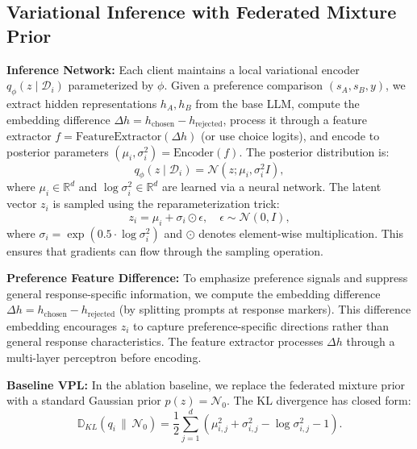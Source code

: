 \subsection{Variational Inference with Federated Mixture Prior}
\label{sec:variational}

\textbf{Inference Network:} Each client maintains a local variational encoder $q_\phi(z \mid \mathcal{D}_i)$ parameterized by $\phi$. Given a preference comparison $(s_A, s_B, y)$, we extract hidden representations $h_A, h_B$ from the base LLM, compute the embedding difference $\Delta h = h_{\text{chosen}} - h_{\text{rejected}}$, process it through a feature extractor $f = \text{FeatureExtractor}(\Delta h)$ (or use choice logits), and encode to posterior parameters $(\mu_i, \sigma_i^2) = \text{Encoder}(f)$. The posterior distribution is:
\begin{equation}
    q_\phi(z \mid \mathcal{D}_i) = \mathcal{N}(z; \mu_i, \sigma_i^2 I),
\end{equation}
where $\mu_i \in \mathbb{R}^d$ and $\log \sigma_i^2 \in \mathbb{R}^d$ are learned via a neural network. The latent vector $z_i$ is sampled using the reparameterization trick:
\begin{equation}
    z_i = \mu_i + \sigma_i \odot \epsilon, \quad \epsilon \sim \mathcal{N}(0, I),
\end{equation}
where $\sigma_i = \exp(0.5 \cdot \log\sigma_i^2)$ and $\odot$ denotes element-wise multiplication. This ensures that gradients can flow through the sampling operation.

\textbf{Preference Feature Difference:} To emphasize preference signals and suppress general response-specific information, we compute the embedding difference $\Delta h = h_{\text{chosen}} - h_{\text{rejected}}$ (by splitting prompts at response markers). This difference embedding encourages $z_i$ to capture preference-specific directions rather than general response characteristics. The feature extractor processes $\Delta h$ through a multi-layer perceptron before encoding.

\textbf{Baseline VPL:} In the ablation baseline, we replace the federated mixture prior with a standard Gaussian prior $p(z) = \mathcal{N}_0$. The KL divergence has closed form:
\begin{equation}
    \mathbb{D}_{KL}(q_i \,\|\, \mathcal{N}_0) = \frac{1}{2} \sum_{j=1}^d \left( \mu_{i,j}^2 + \sigma_{i,j}^2 - \log \sigma_{i,j}^2 - 1 \right).
\end{equation}

